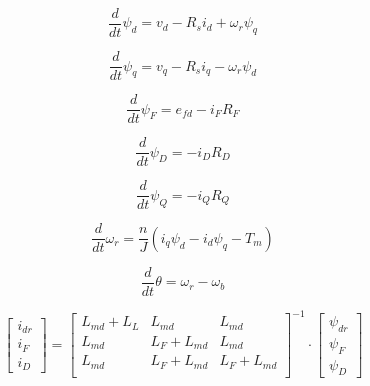 \begin{equation}
    \label{eq:sync_mach_diffeq_1}
    \frac{d}{dt} \psi_d = v_d - R_s i_d + \omega_r \psi_q
\end{equation}

\begin{equation}
    \label{eq:sync_mach_diffeq_2}
    \frac{d}{dt} \psi_q = v_q - R_s i_q - \omega_r \psi_d
\end{equation}

\begin{equation}
    \label{eq:sync_mach_diffeq_3}
    \frac{d}{dt} \psi_F = e_{fd} - i_F R_F
\end{equation}

\begin{equation}
    \label{eq:sync_mach_diffeq_4}
    \frac{d}{dt} \psi_D = -i_D R_D
\end{equation}

\begin{equation}
    \label{eq:sync_mach_diffeq_5}
    \frac{d}{dt} \psi_Q = -i_Q R_Q
\end{equation}

\begin{equation}
    \label{eq:sync_mach_diffeq_6}
    \frac{d}{dt} \omega_r = \frac{n}{J} (i_q \psi_d - i_d \psi_q - T_m )
\end{equation}

\begin{equation}
    \label{eq:sync_mach_diffeq_7}
    \frac{d}{dt} \theta = \omega_r - \omega_b
\end{equation}

\begin{equation}
    \label{eq:sync_mach_alg_1}
    \begin{bmatrix}
        i_{dr} \\
        i_F    \\
        i_D
    \end{bmatrix}
    =
    \begin{bmatrix}
        L_{md} + L_{L} & L_{md}         & L_{md}         \\
        L_{md}         & L_{F} + L_{md} & L_{md}         \\
        L_{md}         & L_{F} + L_{md} & L_{F} + L_{md} \\
    \end{bmatrix}^{-1}
    \cdot
    \begin{bmatrix}
        \psi_{dr} \\
        \psi_F    \\
        \psi_D
    \end{bmatrix}
\end{equation}

